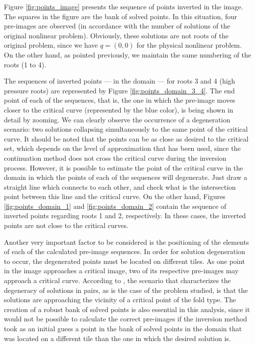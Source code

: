 \documentclass[journal=iecred,manuscript=article]{achemso}
\theoremstyle{definition}
\theoremstyle{remark}
\begin{document}
Figure \ref{fig:points_image} presents the sequence of points inverted in the image. The squares in the figure are the bank of solved points. In this situation, four pre-images are observed (in accordance with the number of solutions of the original nonlinear problem). Obviously, these solutions are not roots of the original problem, since we have $ q = \left(0,0\right) $ for the physical nonlinear problem. On the other hand, as pointed previously, we maintain the same numbering of the roots (1 to 4).

The sequences of inverted points --- in the domain --- for roots 3 and 4 (high pressure roots) are represented by Figure \ref{fig:points_domain_3_4}. The end point of each of the sequences, that is, the one in which the pre-image moves closer to the critical curve (represented by the blue color), is being shown in detail by zooming. We can clearly observe the occurrence of a degeneration scenario: two solutions collapsing simultaneously to the same point of the critical curve. It should be noted that the points can be as close as desired to the critical set, which depends on the level of approximation that has been used, since the continuation method does not cross the critical curve during the inversion process. However, it is possible to estimate the point of the critical curve in the domain in which the points of each of the sequences will degenerate. Just draw a straight line which connects to each other, and check what is the intersection point between this line and the critical curve. On the other hand, Figures \ref{fig:points_domain_1} and \ref{fig:points_domain_2} contain the sequence of inverted points regarding roots 1 and 2, respectively. In these cases, the inverted points are not close to the critical curves.

Another very important factor to be considered is the positioning of the elements of each of the calculated pre-image sequences. In order for solution degeneration to occur, the degenerated points must be located on different tiles. As one point in the image approaches a critical image, two of its respective pre-images may approach a critical curve. According to \citet{malta}, the scenario that characterizes the degeneracy of solutions in pairs, as is the case of the problem studied, is that the solutions are approaching the vicinity of a critical point of the fold type. The creation of a robust bank of solved points is also essential in this analysis, since it would not be possible to calculate the correct pre-images if the inversion method took as an initial guess a point in the bank of solved points in the domain that was located on a different tile than the one in which the desired solution is.
\end{document}
